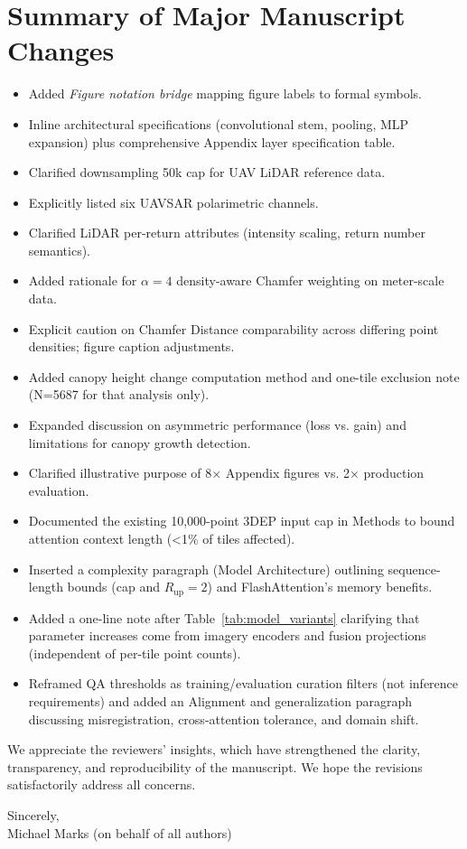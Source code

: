 \documentclass[11pt]{article}
\begin{document}
\section*{Summary of Major Manuscript Changes}
\begin{itemize}
  \item Added \emph{Figure notation bridge} mapping figure labels to formal symbols.
  \item Inline architectural specifications (convolutional stem, pooling, MLP expansion) plus comprehensive Appendix layer specification table.
  \item Clarified downsampling 50k cap for UAV LiDAR reference data.
  \item Explicitly listed six UAVSAR polarimetric channels.
  \item Clarified LiDAR per-return attributes (intensity scaling, return number semantics).
  \item Added rationale for $\alpha=4$ density-aware Chamfer weighting on meter-scale data.
  \item Explicit caution on Chamfer Distance comparability across differing point densities; figure caption adjustments.
  \item Added canopy height change computation method and one-tile exclusion note (N=5687 for that analysis only).
  \item Expanded discussion on asymmetric performance (loss vs. gain) and limitations for canopy growth detection.
  \item Clarified illustrative purpose of 8× Appendix figures vs. 2× production evaluation.
  \item Documented the existing 10,000-point 3DEP input cap in Methods to bound attention context length (\textless1\% of tiles affected).
  \item Inserted a complexity paragraph (Model Architecture) outlining sequence-length bounds (cap and $R_{\text{up}}{=}2$) and FlashAttention’s memory benefits.
  \item Added a one-line note after Table~\ref{tab:model_variants} clarifying that parameter increases come from imagery encoders and fusion projections (independent of per-tile point counts).
  \item Reframed QA thresholds as training/evaluation curation filters (not inference requirements) and added an Alignment and generalization paragraph discussing misregistration, cross-attention tolerance, and domain shift.

\end{itemize}

We appreciate the reviewers’ insights, which have strengthened the clarity, transparency, and reproducibility of the manuscript. We hope the revisions satisfactorily address all concerns.

\vspace{1em}
\noindent Sincerely,\\[4pt]
Michael Marks (on behalf of all authors)
\end{document}
